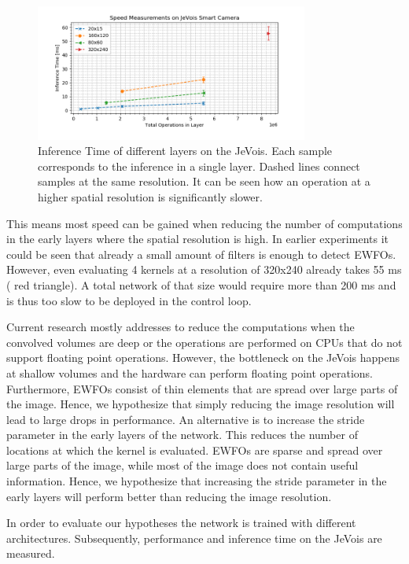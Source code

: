 \begin{figure}[hbtp]
	\centering
	\includegraphics[width=0.8\textwidth]{fig/bottleneck_jevois}
	\caption{Inference Time of different layers on the JeVois. Each sample corresponds to the inference in a single layer. Dashed lines connect samples at the same resolution. It can be seen how an operation at a higher spatial resolution is significantly slower.}
	\label{fig:bottleneck_jevois}
\end{figure}

This means most speed can be gained when reducing the number of computations in the early layers where the spatial resolution is high. In earlier experiments it could be seen that already a small amount of filters is enough to detect \acp{EWFO}. However, even evaluating 4 kernels at a resolution of 320x240 already takes 55 ms ( red triangle). A total network of that size would require more than 200 ms and is thus too slow to be deployed in the control loop.

Current research mostly addresses to reduce the computations when the convolved volumes are deep or the operations are performed on \acp{CPU} that do not support floating point operations. However, the bottleneck on the JeVois happens at shallow volumes and the hardware can perform floating point operations. Furthermore, \acp{EWFO} consist of thin elements that are spread over large parts of the image. Hence, we hypothesize that simply reducing the image resolution will lead to large drops in performance. An alternative is to increase the stride parameter in the early layers of the network. This reduces the number of locations at which the kernel is evaluated. \acp{EWFO} are sparse and spread over large parts of the image, while most of the image does not contain useful information. Hence, we hypothesize that increasing the stride parameter in the early layers will perform better than reducing the image resolution.

In order to evaluate our hypotheses the network is trained with different architectures. Subsequently, performance and inference time on the JeVois are measured.

